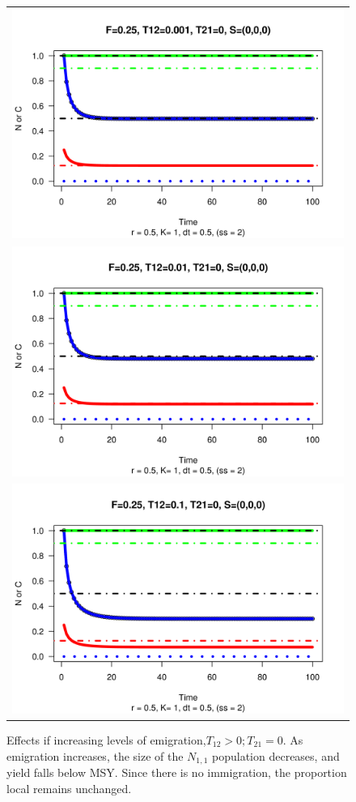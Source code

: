\documentclass[12pt,letterpaper]{article}
\newcommand\None{{N_{1,1}}}
\begin{document}
\begin{figure}
\begin{center}
\begin{tabular}{c}
\includegraphics[height=0.5\textwidth]{./graphics/r05F025T120001T210S000.png}\\
\includegraphics[height=0.5\textwidth]{./graphics/r05F025T12001T210S000.png}\\
\includegraphics[height=0.5\textwidth]{./graphics/r05F025T1201T210S000.png}\\
\end{tabular}
\caption{\label{fig:emigration}
Effects if increasing levels of emigration,$T_{12} > 0; T_{21} = 0$.
As emigration increases, the size of the $\None$ population decreases, and
yield falls below MSY. Since there is no immigration, the
proportion local remains unchanged.
}
\end{center}
\end{figure}
\end{document}

